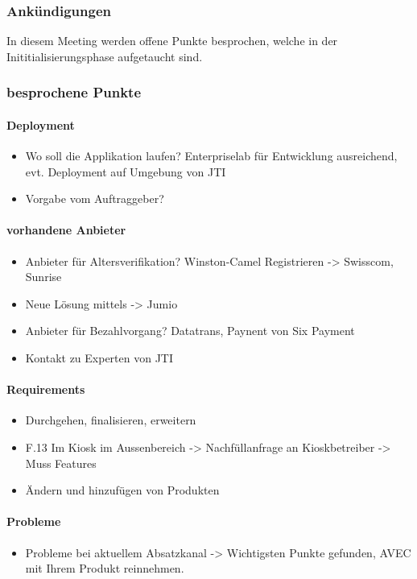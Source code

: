 \subsubsection{Ankündigungen}
In diesem Meeting werden offene Punkte besprochen, welche in der Inititialisierungsphase aufgetaucht sind. 
\subsubsection{besprochene Punkte}
\paragraph{Deployment}
\begin{itemize}
	\item Wo soll die Applikation laufen? Enterpriselab für Entwicklung ausreichend, evt. Deployment auf Umgebung von JTI
	\item Vorgabe vom Auftraggeber? 
\end{itemize}
\paragraph{vorhandene Anbieter}
\begin{itemize}
	\item Anbieter für Altersverifikation? Winston-Camel Registrieren -> Swisscom, Sunrise
	\item Neue Lösung mittels -> Jumio
	\item Anbieter für Bezahlvorgang? Datatrans, Paynent von Six Payment 
	\item Kontakt zu Experten von JTI
\end{itemize}
\paragraph{Requirements}
\begin{itemize}
	\item Durchgehen, finalisieren, erweitern
	\item F.13 Im Kiosk im Aussenbereich -> Nachfüllanfrage an Kioskbetreiber -> Muss Features
	\item Ändern und hinzufügen von Produkten
\end{itemize}
\paragraph{Probleme}
	\begin{itemize}
	\item Probleme bei aktuellem Absatzkanal -> Wichtigsten Punkte gefunden, AVEC mit Ihrem Produkt reinnehmen. 
	\end{itemize}

